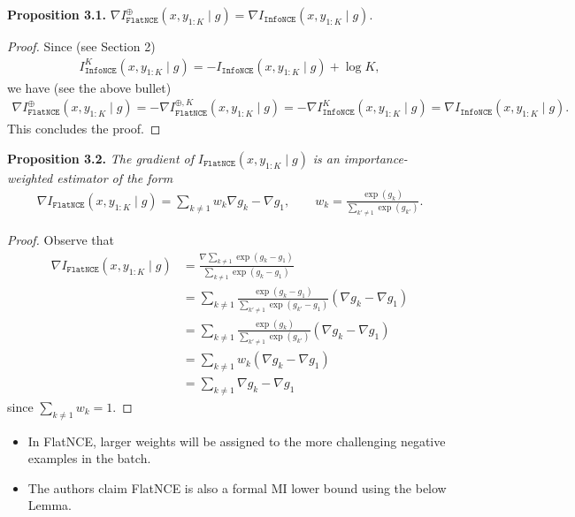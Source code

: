 \documentclass[10pt]{article}
\newcommand{\infonce}{\texttt{InfoNCE}}
\newcommand{\flatnce}{\texttt{FlatNCE}}
\begin{document}
\textbf{Proposition 3.1.} $\nabla I^\oplus_\flatnce(x,y_{1:K} \mid g) = \nabla I_\infonce(x,y_{1:K} \mid g)$.
\begin{proof}
Since (see Section 2)
\begin{align*}
I^K_\infonce(x,y_{1:K} \mid g) = -I_\infonce(x,y_{1:K} \mid g) + \log K,
\end{align*}
we have (see the above bullet)
\begin{align*}
\nabla I^\oplus_\flatnce(x,y_{1:K} \mid g) = - \nabla I^{\oplus,K}_\flatnce(x,y_{1:K} \mid g) = - \nabla I_\infonce^K(x,y_{1:K} \mid g) = \nabla I_\infonce(x,y_{1:K} \mid g).
\end{align*}
This concludes the proof.
\end{proof}

\textbf{Proposition 3.2.} \textit{The gradient of} $I_\flatnce(x,y_{1:K} \mid g)$ \textit{is an importance-weighted estimator of the form}
\begin{align*}
\nabla I_\flatnce(x,y_{1:K} \mid g) = \sum_{k \neq 1} w_k \nabla g_k - \nabla g_1, \qquad w_k = \frac{\exp(g_k)}{\sum_{k' \neq 1} \exp(g_{k'})}.
\end{align*}
\begin{proof}
Observe that
\begin{align*}
\nabla I_\flatnce(x,y_{1:K} \mid g) &= \frac{\nabla \sum_{k \neq 1} \exp(g_k - g_1)}{\sum_{k \neq 1} \exp(g_k - g_1)} \\
&= \sum_{k \neq 1} \frac{\exp(g_k - g_1)}{\sum_{k' \neq 1} \exp(g_{k'} - g_1)} (\nabla g_k - \nabla g_1) \\
&= \sum_{k \neq 1} \frac{\exp(g_k)}{\sum_{k' \neq 1} \exp(g_{k'})} (\nabla g_k - \nabla g_1) \\
&= \sum_{k \neq 1} w_k (\nabla g_k - \nabla g_1) \\
&= \sum_{k \neq 1} \nabla g_k - \nabla g_1
\end{align*}
since $\sum_{k \neq 1} w_k = 1$.
\end{proof}

\newpage

\begin{itemize}
\item In FlatNCE, larger weights will be assigned to the more challenging negative examples in the batch.
\item The authors claim FlatNCE is also a formal MI lower bound using the below Lemma.
\end{itemize}
\end{document}

